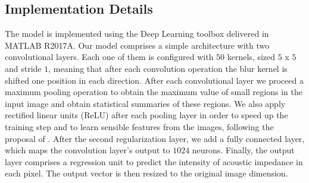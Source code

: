 \documentclass[conference]{IEEEtran}
\begin{document}
\subsection{Implementation Details}
The model is implemented using the Deep Learning toolbox
delivered in MATLAB R2017A. Our model comprises a simple architecture with two convolutional layers.
Each one of them is configured with $50$ kernels, sized $5$ x $5$
and stride $1$, meaning that after each convolution operation the blur kernel is shifted
one position in each direction. After each convolutional layer we proceed a maximum pooling operation
to obtain the maximum value of small regions in the input image and obtain statistical summaries of these regions. We also
apply rectified linear units (ReLU) after each pooling layer in order to speed up the training
step and to learn sensible features from the images, following the proposal of \cite{Nair2010}. After
the second regularization layer,  we add a fully connected layer, which maps the convolution layer's output
to $1024$ neurons. Finally, the output layer comprises a regression unit to predict the intensity of acoustic impedance in each pixel.
The output vector is then resized to the original image dimension.
\end{document}
